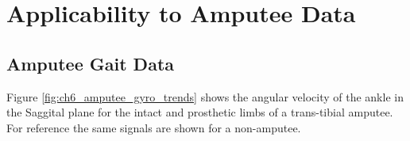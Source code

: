 \chapter{Applicability to Amputee Data}
\label{chp:amputee-data}




\section{Amputee Gait Data}
Figure \ref{fig:ch6_amputee_gyro_trends} shows the angular velocity of the ankle in the Saggital plane for the intact and prosthetic limbs of a trans-tibial amputee. For reference the same signals are shown for a non-amputee.
